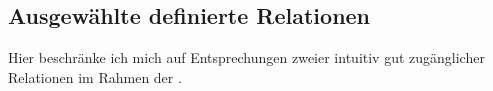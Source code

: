     
\subsection{Ausgewählte definierte Relationen}



    Hier beschränke ich mich auf Entsprechungen zweier intuitiv gut zugänglicher Relationen im Rahmen der \strukt.

